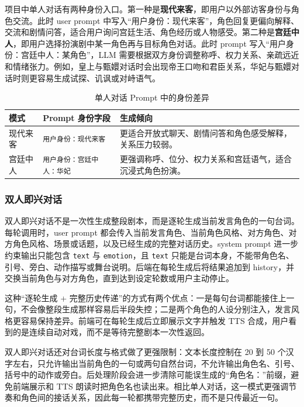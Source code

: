 \documentclass[12pt,a4paper]{article}
\begin{document}
项目中单人对话有两种身份入口。第一种是\textbf{现代来客}，即用户以外部访客身份与角色交流。此时 user prompt 中写入“用户身份：现代来客”，角色回复更偏向解释、交流和剧情问答，适合用户询问宫廷生活、角色经历或人物感受。第二种是\textbf{宫廷中人}，即用户选择扮演剧中某一角色再与目标角色对话。此时 prompt 写入“用户身份：宫廷中人：某角色”，LLM 需要根据双方身份调整称呼、权力关系、亲疏远近和情绪张力。例如，皇上与甄嬛对话时会出现帝王口吻和君臣关系，华妃与甄嬛对话时则更容易生成试探、讥讽或对峙语气。

\begin{table}[H]
\centering
\caption{单人对话 Prompt 中的身份差异}
\label{tab:prompt-identity}
\begin{tabularx}{\textwidth}{p{3.0cm}p{5.0cm}X}
\toprule
\rowcolor{Bmid!18}
\textbf{模式} & \textbf{Prompt 身份字段} & \textbf{生成倾向} \\
\midrule
\rowcolor{Blight}
现代来客 & \texttt{用户身份：现代来客} & 更适合开放式聊天、剧情问答和角色感受解释，关系压力较弱。 \\
\rowcolor{white}
宫廷中人 & \texttt{用户身份：宫廷中人：华妃} & 更强调称呼、位分、权力关系和宫廷语气，适合沉浸式角色扮演。 \\
\bottomrule
\end{tabularx}
\end{table}

\subsubsection{双人即兴对话}

双人即兴对话不是一次性生成整段剧本，而是逐轮生成当前发言角色的一句台词。每轮调用时，user prompt 都会传入当前发言角色、当前角色风格、对方角色、对方角色风格、场景或话题，以及已经生成的完整对话历史。system prompt 进一步约束输出只能包含 \texttt{text} 与 \texttt{emotion}，且 \texttt{text} 只能是台词本身，不能带角色名、引号、旁白、动作描写或舞台说明。后端在每轮生成后将结果追加到 history，并交换当前角色与对方角色，直到达到设定轮数或用户主动停止。

这种“逐轮生成 + 完整历史传递”的方式有两个优点：一是每句台词都能接住上一句，不会像整段生成那样容易后半段失控；二是两个角色的人设分别注入，发言风格更容易保持差异。前端可在每轮生成后立即展示文字并触发 TTS 合成，用户看到的是连续自动对戏，而不是等待完整剧本一次性返回。

双人即兴对话还对台词长度与格式做了更强限制：文本长度控制在 20 到 50 个汉字左右，只允许输出当前角色的一句或两句自然台词，不允许输出角色名、引号、括号中的动作或旁白。后处理阶段会进一步清除可能误生成的“角色名：”前缀，避免前端展示和 TTS 朗读时把角色名也读出来。相比单人对话，这一模式更强调节奏和角色间的接话关系，因此每一轮都携带完整历史，而不是只传最近一句。
\end{document}
